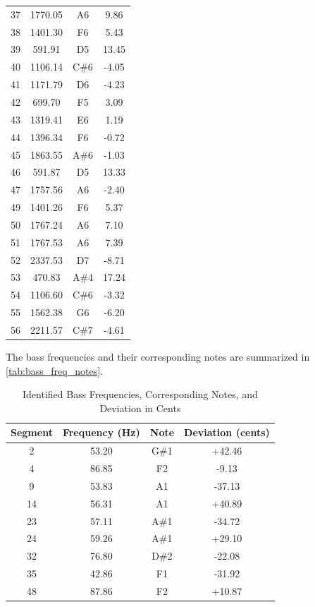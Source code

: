 \begin{table}[h]
\begin{tabular}{cccc}
        37 & 1770.05 & A6    & 9.86    \\
        38 & 1401.30 & F6    & 5.43    \\
        39 & 591.91  & D5    & 13.45   \\
        40 & 1106.14 & C\#6  & -4.05   \\
        41 & 1171.79 & D6    & -4.23   \\
        42 & 699.70  & F5    & 3.09    \\
        43 & 1319.41 & E6    & 1.19    \\
        44 & 1396.34 & F6    & -0.72   \\
        45 & 1863.55 & A\#6  & -1.03   \\
        46 & 591.87  & D5    & 13.33   \\
        47 & 1757.56 & A6    & -2.40   \\
        49 & 1401.26 & F6    & 5.37    \\
        50 & 1767.24 & A6    & 7.10    \\
        51 & 1767.53 & A6    & 7.39    \\
        52 & 2337.53 & D7    & -8.71   \\
        53 & 470.83  & A\#4  & 17.24   \\
        54 & 1106.60 & C\#6  & -3.32   \\
        55 & 1562.38 & G6    & -6.20   \\
        56 & 2211.57 & C\#7  & -4.61   \\
        \hline
    \end{tabular}
    \label{tab:melody_freq_notes}
\end{table}

The bass frequencies and their corresponding notes are summarized in \autoref{tab:bass_freq_notes}. 

\begin{table}[h]
    \centering
    \caption{Identified Bass Frequencies, Corresponding Notes, and Deviation in Cents}
    \begin{tabular}{cccc}
        \hline
        Segment & Frequency (Hz) & Note & Deviation (cents) \\
        \hline
        2  & 53.20  & G\#1  & +42.46 \\
        4  & 86.85  & F2    & -9.13  \\
        9  & 53.83  & A1    & -37.13 \\
        14 & 56.31  & A1    & +40.89 \\
        23 & 57.11  & A\#1  & -34.72 \\
        24 & 59.26  & A\#1  & +29.10 \\
        32 & 76.80  & D\#2  & -22.08 \\
        35 & 42.86  & F1    & -31.92 \\
        48 & 87.86  & F2    & +10.87 \\
        \hline
    \end{tabular}
    \label{tab:bass_freq_notes}
\end{table}

